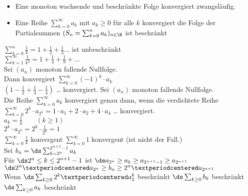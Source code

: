 %
\begin{itemize}
    \item{Eine monoton wachsende und beschränkte Folge konvergiert zwangsläufig.}
    \item{Eine Reihe $\sum_{k=0}^{∞} a_k$ mit $a_k \geq 0$ für alle $k$ konvergiert \equ die Folge der Partialsummen $(S_n = \sum_{k=0}^{n} a_k)_{n \in \N}$ ist beschränkt}
\end{itemize}
%
\bsp
    $\sum_{k=0}^{n} \frac{1}{k} = 1 + \frac{1}{2} + \frac{1}{3} …$ ist unbeschränkt\\
\bsp
    $\sum_{k=1}^{\infty} \frac{1}{k^2} = 1 + \frac{1}{4} + \frac{1}{9}+…$\\
    Sei $(a_n)$ monoton fallende Nullfolge.\\
    Dann konvergiert $\sum_{k=0}^{∞} (-1)^k \cdot a_k$\\
\bsp
    $(1 - \frac{1}{2} + \frac{1}{3} - \frac{1}{4})$ … konvergiert.
Sei $(a_n)$ monoton fallende Nullfolge.\\
Die Reihe $\sum_{k=0}^{\infty} a_k$ konvergiert genau dann, wenn die verdichtete Reihe $\sum_{k=0}^{\infty} 2^k \cdot a_{2^k} = 1 · a_1 + 2 · a_2 + 4 \cdot a_4$ … konvergiert.\\
%
\bsp
    $a_k = \frac{1}{k}\qquad (k \geq 1)$\\
    $2^k \cdot a_{2^k} = 2^k \cdot \frac{1}{2^k} = 1$\\
%
$\sum_{k=0}^\infty \frac{1}{k}$ konvergent \equ $\sum_{k=0}^\infty 1$ konvergent (ist nicht der Fall.)\\
\bew
Sei $b_n = \ds\sum_{k=2^n}^{2^{n+1}-1} a_k$\\
Für $\ds 2^n \leq k \leq 2^{n+1} - 1$ ist $\ds a_{2^n} \geq a_{k} \geq a_{2^{n+1} - 1} \geq a_{2^{n+1}}$ \Rarr $\ds 2^n · a_{2^n} \geq b_n \geq  2^n · a_{2^{n+1}}$\\
Wenn $\ds \sum_{k \geq 0} 2^k · a_2^k$ beschränkt \Rarr $\ds \sum_{k \geq 0} b_k$ beschränkt \Rarr $\ds \sum_{k \geq 0} a_k$ beschränkt\\
